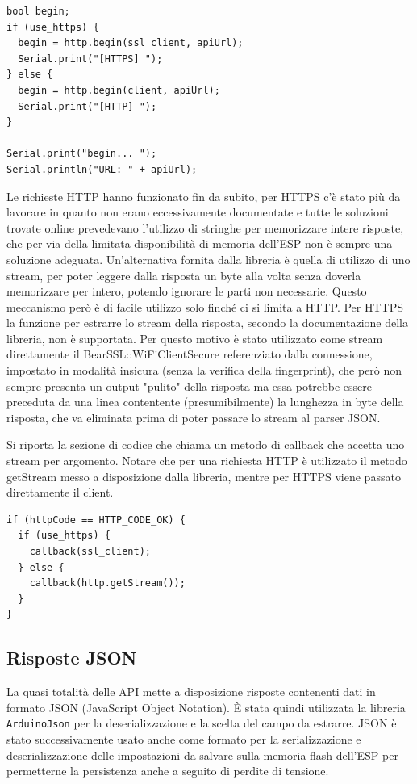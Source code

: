 \documentclass[12pt,a4paper]{report}
\begin{document}
\begin{lstlisting}
bool begin;
if (use_https) {
  begin = http.begin(ssl_client, apiUrl);
  Serial.print("[HTTPS] ");
} else {
  begin = http.begin(client, apiUrl);
  Serial.print("[HTTP] ");
}

Serial.print("begin... ");
Serial.println("URL: " + apiUrl);
\end{lstlisting}

Le richieste HTTP hanno funzionato fin da subito, per HTTPS c'è stato più da lavorare in quanto non erano eccessivamente
documentate e tutte le soluzioni trovate online prevedevano l'utilizzo di stringhe per memorizzare intere risposte, che per via
della limitata disponibilità di memoria dell'ESP non è sempre una soluzione adeguata.
Un'alternativa fornita dalla libreria è quella di utilizzo di uno stream, per poter leggere dalla risposta un byte alla volta senza doverla
memorizzare per intero, potendo ignorare le parti non necessarie. Questo meccanismo però è di facile utilizzo solo finché ci si limita a
HTTP. Per HTTPS la funzione per estrarre lo stream della risposta, secondo la documentazione della libreria, non è supportata.
Per questo motivo è stato utilizzato come stream direttamente il BearSSL::WiFiClientSecure referenziato dalla connessione, impostato in
modalità insicura (senza la verifica della fingerprint), che però non sempre presenta un output "pulito" della risposta ma essa potrebbe
essere preceduta da una linea contentente (presumibilmente) la lunghezza in byte della risposta, che va eliminata prima di poter
passare lo stream al parser JSON.

Si riporta la sezione di codice che chiama un metodo di callback che accetta uno stream per argomento. Notare che per una richiesta
HTTP è utilizzato il metodo getStream messo a disposizione dalla libreria, mentre per HTTPS viene passato direttamente il client.
\begin{lstlisting}
if (httpCode == HTTP_CODE_OK) {
  if (use_https) {
    callback(ssl_client);
  } else {
    callback(http.getStream());
  }
}
\end{lstlisting}

\subsection{Risposte JSON}
La quasi totalità delle API mette a disposizione risposte contenenti dati in formato JSON (JavaScript Object Notation). È stata quindi
utilizzata la libreria \texttt{ArduinoJson} per la deserializzazione e la scelta del campo da estrarre.
JSON è stato successivamente usato anche come formato per la serializzazione e deserializzazione delle impostazioni da salvare sulla
memoria flash dell'ESP per permetterne la persistenza anche a seguito di perdite di tensione.
\end{document}
